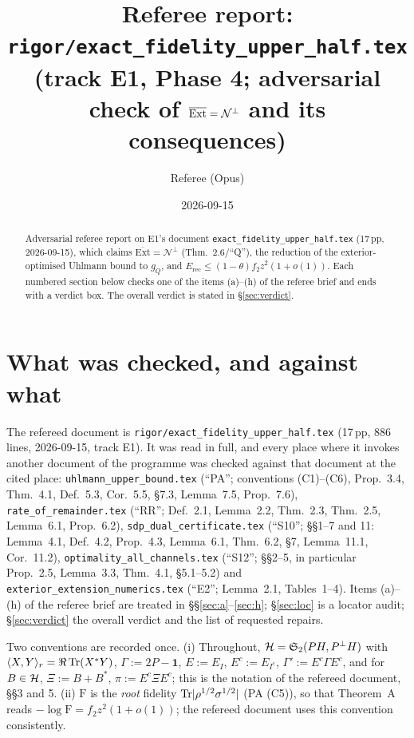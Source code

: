 \documentclass[11pt]{article}
\title{Referee report: \texttt{rigor/exact\_fidelity\_upper\_half.tex}\\
\large (track E1, Phase 4; adversarial check of $\overline{\Ext}=\Nvis^{\perp}$ and its consequences)}
\author{Referee (Opus)}\date{2026-09-15}
\newcommand{\Stwo}{\mathfrak S_2}\newcommand{\Sone}{\mathfrak S_1}
\newcommand{\ip}[2]{\langle #1,#2\rangle}\newcommand{\one}{\mathbf 1}
\newcommand{\Ext}{\mathrm{Ext}}\newcommand{\Nvis}{\mathcal N}
\newcommand{\Erec}{E_{\mathrm{rec}}}\newcommand{\Gs}{\mathcal G}
\begin{document}
\maketitle
\begin{abstract}
Adversarial referee report on E1's document \texttt{exact\_fidelity\_upper\_half.tex}
(17\,pp, 2026-09-15), which claims $\overline{\Ext}=\Nvis^{\perp}$ (Thm.~2.6/``Q''),
the reduction of the exterior-optimised Uhlmann bound to $g_Q$, and
$\Erec\le(1-\theta)f_2z^2(1+o(1))$.  Each numbered section below checks one of the
items (a)--(h) of the referee brief and ends with a verdict box.  The overall verdict
is stated in \S\ref{sec:verdict}.
\end{abstract}
\tableofcontents
\section{What was checked, and against what}\label{sec:scope}

The refereed document is \texttt{rigor/exact\_fidelity\_upper\_half.tex} (17\,pp, 886 lines,
2026-09-15, track E1).  It was read in full, and every place where it invokes another
document of the programme was checked against that document at the cited place:
\texttt{uhlmann\_upper\_bound.tex} (``PA''; conventions (C1)--(C6), Prop.~3.4, Thm.~4.1,
Def.~5.3, Cor.~5.5, \S7.3, Lemma~7.5, Prop.~7.6),
\texttt{rate\_of\_remainder.tex} (``RR''; Def.~2.1, Lemma~2.2, Thm.~2.3, Thm.~2.5,
Lemma~6.1, Prop.~6.2), \texttt{sdp\_dual\_certificate.tex} (``S10''; \S\S1--7 and 11:
Lemma~4.1, Def.~4.2, Prop.~4.3, Lemma~6.1, Thm.~6.2, \S7, Lemma~11.1, Cor.~11.2),
\texttt{optimality\_all\_channels.tex} (``S12''; \S\S2--5, in particular Prop.~2.5,
Lemma~3.3, Thm.~4.1, \S5.1--5.2) and \texttt{exterior\_extension\_numerics.tex}
(``E2''; Lemma~2.1, Tables~1--4).  Items (a)--(h) of the referee brief are treated in
\S\S\ref{sec:a}--\ref{sec:h}; \S\ref{sec:loc} is a locator audit; \S\ref{sec:verdict} the
overall verdict and the list of requested repairs.

Two conventions are recorded once.  (i) Throughout, $\cH=\Stwo(PH,\Pperp H)$ with
$\ip XY_r=\Re\Tr(X^*Y)$, $\Gamma:=2P-\one$, $E:=E_I$, $E^c:=E_{I^c}$,
$\Gamma':=E^c\Gamma E^c$, and for $B\in\mathcal H$, $\Xi:=B+B^*$, $\pi:=E^c\Xi E^c$; this is the
notation of the refereed document, \S\S3 and 5.  (ii) $\mathrm F$ is the \emph{root}
fidelity $\operatorname{Tr}\lvert\rho^{1/2}\sigma^{1/2}\rvert$ (PA (C5)), so that Theorem~A reads
$-\log\mathrm F=f_2z^2(1+o(1))$; the refereed document uses this convention consistently.
\end{document}

